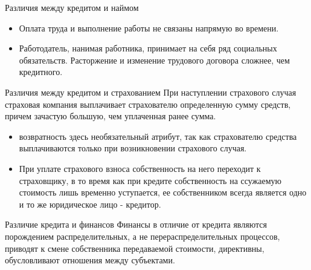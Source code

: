\documentclass[_DKB_p2_Credit.tex]{subfiles}
\begin{document}
\begin{frame}{Различия между кредитом и наймом}
\begin{itemize}
\item
Оплата труда и выполнение работы не связаны напрямую во времени.
\item
Работодатель, нанимая работника, принимает на себя ряд социальных обязательств. Расторжение и изменение трудового договора сложнее, чем кредитного.
\end{itemize}
\end{frame}

\begin{frame}{Различия между кредитом и страхованием}
При наступлении страхового случая страховая компания выплачивает страхователю определенную сумму средств, причем зачастую большую, чем уплаченная ранее сумма.
\begin{itemize}
\item
возвратность здесь необязательный атрибут, так как страхователю средства выплачиваются только при возникновении страхового случая. 
\item
При уплате страхового взноса собственность на него переходит к страховщику, в то время как при кредите собственность на ссужаемую стоимость лишь временно уступается, ее собственником всегда является одно и то же юридическое лицо - кредитор.
\end{itemize}
\end{frame}

\begin{frame}{Различие кредита и финансов}
Финансы в отличие от кредита являются порождением распределительных, а не перераспределительных процессов, приводят к смене собственника передаваемой стоимости, директивны, обусловливают отношения между субъектами.
\end{frame}
\end{document}
